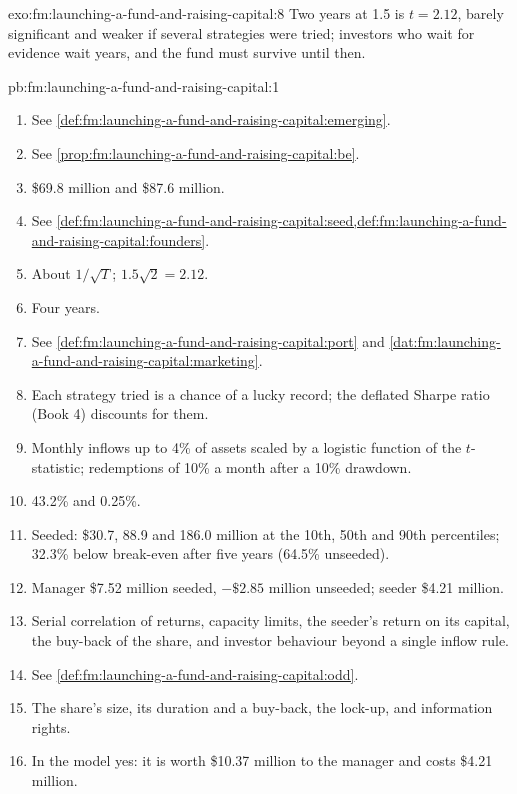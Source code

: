 \begin{solution}{exo:fm:launching-a-fund-and-raising-capital:8}
Two years at 1.5 is $t=2.12$, barely significant and weaker if several strategies were tried; investors who wait for evidence wait years, and the
fund must survive until then.
\end{solution}

\begin{solution}{pb:fm:launching-a-fund-and-raising-capital:1}
\begin{enumerate}
\item See \cref{def:fm:launching-a-fund-and-raising-capital:emerging}.
\item See \cref{prop:fm:launching-a-fund-and-raising-capital:be}.
\item \$69.8 million and \$87.6 million.
\item See \cref{def:fm:launching-a-fund-and-raising-capital:seed,def:fm:launching-a-fund-and-raising-capital:founders}.
\item About $1/\sqrt T$; $1.5\sqrt2=2.12$.
\item Four years.
\item See \cref{def:fm:launching-a-fund-and-raising-capital:port} and \cref{dat:fm:launching-a-fund-and-raising-capital:marketing}.
\item Each strategy tried is a chance of a lucky record; the deflated Sharpe ratio (Book 4) discounts for them.
\item Monthly inflows up to 4\% of assets scaled by a logistic function of the $t$-statistic; redemptions of 10\% a month after a 10\% drawdown.
\item 43.2\% and 0.25\%.
\item Seeded: \$30.7, 88.9 and 186.0 million at the 10th, 50th and 90th percentiles; 32.3\% below break-even after five years (64.5\% unseeded).
\item Manager \$7.52 million seeded, $-\$2.85$ million unseeded; seeder \$4.21 million.
\item Serial correlation of returns, capacity limits, the seeder's return on its capital, the buy-back of the share, and investor behaviour beyond a
single inflow rule.
\item See \cref{def:fm:launching-a-fund-and-raising-capital:odd}.
\item The share's size, its duration and a buy-back, the lock-up,  and information rights.
\item In the model yes: it is worth \$10.37 million to the manager and costs \$4.21 million.

\end{enumerate}
\end{solution}
